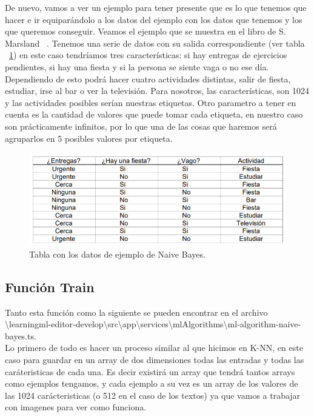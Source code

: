 \documentclass[a4paper, 12pt]{book}
\begin{document}
De nuevo, vamos a ver un ejemplo para tener presente que es lo que tenemos que hacer e ir equiparándolo a los datos del ejemplo con los datos que tenemos y los que queremos conseguir. Veamos el ejemplo que se muestra en el libro de S. Marsland ~\cite{machinelearning}. Tenemos una serie de datos con su salida correspondiente (ver tabla ~\ref{fig:tablabayes}) en este caso tendríamos tres características: si hay entregas de ejercicios pendientes, si hay una fiesta y si la persona se siente vaga o no ese día. Dependiendo de esto podrá hacer cuatro actividades distintas, salir de fiesta, estudiar, irse al bar o ver la televisión. 
Para nosotros, las características, son 1024 y las actividades posibles serían nuestras etiquetas. Otro parametro a tener en cuenta es la cantidad de valores que puede tomar cada etiqueta, en nuestro caso son prácticamente infinitos, por lo que una de las cosas que haremos será agruparlos en 5 posibles valores por etiqueta. 

\begin{figure}
	\centering
	\includegraphics[width=12cm, keepaspectratio]{img/tablabayes}
	\caption{Tabla con los datos de ejemplo de Naive Bayes.}			
	\label{fig:tablabayes}
\end{figure}



\subsection{Función Train} 
\label{sec:funciontrainbayes}

Tanto esta función como la siguiente se pueden encontrar en el archivo \textbackslash learningml-editor-develop\textbackslash src\textbackslash app\textbackslash services\textbackslash mlAlgorithms\textbackslash ml-algorithm-naive-bayes.ts.\\
Lo primero de todo es hacer un proceso similar al que hicimos en K-NN, en este caso para guardar en un array de dos dimensiones todas las entradas y todas las caráteristicas de cada una. Es decir existirá un array que tendrá tantos arrays como ejemplos tengamos, y cada ejemplo a su vez es un array de los valores de las 1024 carácteristicas (o 512 en el caso de los textos) ya que vamos a trabajar con imagenes para ver como funciona.
\end{document}
